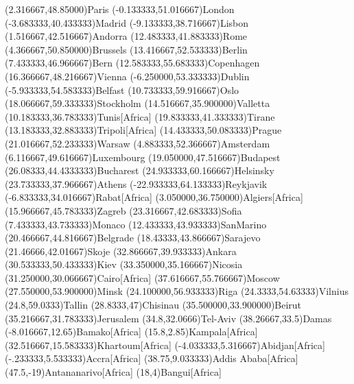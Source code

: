 \mapput[90](2.316667,48.85000){Paris}
\mapput[90](-0.133333,51.016667){London}
\mapput[90](-3.683333,40.433333){Madrid}
\mapput[90](-9.133333,38.716667){Lisbon}
\mapput[90](1.516667,42.516667){Andorra}
\mapput[90](12.483333,41.883333){Rome}
\mapput[40](4.366667,50.850000){Brussels}
\mapput[90](13.416667,52.533333){Berlin}
\mapput[90](7.433333,46.966667){Bern}
\mapput[0](12.583333,55.683333){Copenhagen}
\mapput[90](16.366667,48.216667){Vienna}
\mapput[90](-6.250000,53.333333){Dublin}
\mapput[90](-5.933333,54.583333){Belfast}
\mapput[90](10.733333,59.916667){Oslo}
\mapput[90](18.066667,59.333333){Stockholm}
\mapput[90](14.516667,35.900000){Valletta}
\mapput[90](10.183333,36.783333){Tunis}[Africa]
\mapput[90](19.833333,41.333333){Tirane}
\mapput[90](13.183333,32.883333){Tripoli}[Africa]
\mapput[90](14.433333,50.083333){Prague}
\mapput[90](21.016667,52.233333){Warsaw}
\mapput[90](4.883333,52.366667){Amsterdam}
\mapput[-60](6.116667,49.616667){Luxembourg}
\mapput[0](19.050000,47.516667){Budapest}
\mapput[90](26.08333,44.4333333){Bucharest}
\mapput[90](24.933333,60.166667){Helsinsky}
\mapput[90](23.733333,37.966667){Athens}
\mapput[90](-22.933333,64.133333){Reykjavik}
\mapput[90](-6.833333,34.016667){Rabat}[Africa]
\mapput[90](3.050000,36.750000){Algiers}[Africa]
\mapput[90](15.966667,45.783333){Zagreb}
\mapput[90](23.316667,42.683333){Sofia}
\mapput[90](7.433333,43.733333){Monaco}
\mapput[90](12.433333,43.933333){SanMarino}
\mapput[90](20.466667,44.816667){Belgrade}
\mapput[90](18.43333,43.866667){Sarajevo}
\mapput[90](21.46666,42.01667){Skoje}
\mapput[90](32.866667,39.933333){Ankara}
\mapput[90](30.533333,50.433333){Kiev}
\mapput[90](33.350000,35.166667){Nicosia}
\mapput[90](31.250000,30.066667){Cairo}[Africa]
\mapput[90](37.616667,55.766667){Moscow}
\mapput[-90](27.550000,53.900000){Minsk}
\mapput[90](24.100000,56.933333){Riga}
\mapput[90](24.3333,54.63333){Vilnius}
\mapput[90](24.8,59.0333){Tallin}
\mapput[90](28.8333,47){Chisinau}
\mapput[90](35.500000,33.900000){Beirut}
\mapput[0](35.216667,31.783333){Jerusalem}
\mapput[180](34.8,32.0666){Tel-Aviv}
\mapput[90](38.26667,33.5){Damas}
\mapput[90](-8.016667,12.65){Bamako}[Africa] %
\mapput[90](15.8,2.85){Kampala}[Africa] %
\mapput[90](32.516667,15.583333){Khartoum}[Africa] %
\mapput[90](-4.033333,5.316667){Abidjan}[Africa] %
\mapput[90](-.233333,5.533333){Accra}[Africa] %
\mapput[90](38.75,9.033333){Addis Ababa}[Africa] %
\mapput[90](47.5,-19){Antananarivo}[Africa] %
\mapput[90](18,4){Bangui}[Africa] %
